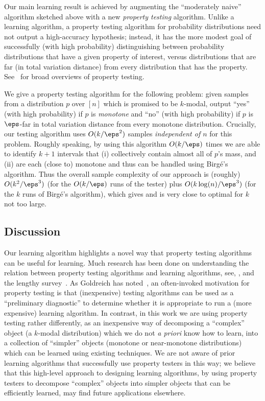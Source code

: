 Our main learning result is achieved by augmenting the ``moderately naive'' 
algorithm sketched above with a new \emph{property testing} algorithm.  
 {Unlike a learning algorithm, a property testing algorithm
for probability distributions need not output a high-accuracy hypothesis;
instead, it has the more modest goal of successfully (with high probability)
distinguishing between probability distributions that have a given property 
of interest, versus distributions that are far (in total variation distance)
from every distribution that has the property.  See~\cite{GGR98,
Ron:10FNTTCS, PropertyTestingICS} for broad overviews of property testing.}

We give a property testing algorithm for the following problem:  given
samples {from a distribution $p$ over $[n]$ which is promised to be
$k$-modal}, output ``yes'' (with high probability) if $p$ is 
\emph{monotone} and ``no'' (with high probability) if $p$ is
$\eps$-far {in total variation distance} 
from every monotone distribution.  
Crucially, our testing algorithm uses $O({k}/\eps^2)$ samples 
\emph{independent of $n$}
for this problem.  Roughly speaking, by using this algorithm $O(k/\eps)$ 
times we are able to identify
$k+1$ intervals that (i) collectively contain almost all of $p$'s mass, 
and (ii) are each (close to) monotone and thus can be handled using 
Birg\'{e}'s algorithm.  Thus the overall sample complexity of our approach is 
(roughly) ${O(k^2/\eps^3)}$ (for the $O(k/\eps)$
runs of the tester) plus $O(k\log(n)/\eps^3)$ (for the $k$ runs 
of Birg\'{e}'s algorithm), which gives  and is very 
close to optimal for $k$ not too large.

\subsection{Discussion}
Our learning algorithm highlights a novel way that property testing algorithms can be useful
for learning.  Much research has been done on understanding the relation between property testing
algorithms and learning algorithms, see, \eg, \cite{GGR98,KR00} and the lengthy survey~\cite{Ron:08testlearn}.  As Goldreich has noted~\cite{Goldreich:11web}, an often-invoked motivation for
property testing is that (inexpensive) testing algorithms can be used as a ``preliminary diagnostic''
to determine whether it is appropriate to run a (more expensive) learning algorithm.  In contrast, in this work we are using property testing rather differently, as an inexpensive way of decomposing a ``complex'' object (a $k$-modal
distribution) which we do not \emph{a priori} know how to learn, into a collection of ``simpler'' objects (monotone or near-monotone distributions) which can be learned using existing techniques.  We are not aware of prior learning algorithms that successfully use property testers in this way;
we believe that this high-level
approach to designing learning algorithms, by using property testers to decompose ``complex'' objects into simpler objects that can be efficiently learned, may find future applications elsewhere.


